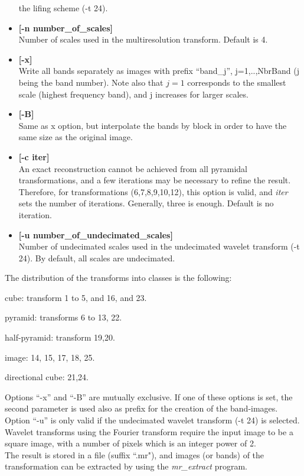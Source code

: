 \begin{itemize}
 the lifing scheme (-t 24).
\item {\bf [-n number\_of\_scales]} \\
 Number of scales used in the multiresolution transform.
 Default is 4.
\item {\bf [-x]} \\
 Write all bands separately as images with prefix ``band\_j'', j=1,..,NbrBand
 (j being the band number). Note also that $j=1$ corresponds to 
 the smallest scale (highest frequency band), and j increases for larger
 scales.
\item {\bf [-B]} \\
 Same as x option, but interpolate the bands by block in order to
 have the same size as the original image.
\item {\bf [-c iter]} \\
An exact reconstruction cannot be achieved from all 
pyramidal transformations, and a few iterations may be necessary to refine
the result. 
Therefore, for transformations (6,7,8,9,10,12), this option
is valid, and {\em iter} sets the  number of iterations. Generally,
three is enough. Default is no iteration.
\item {\bf [-u number\_of\_undecimated\_scales]} \\
Number of undecimated scales used in the undecimated wavelet 
transform (-t 24).
By default, all scales are undecimated.
\end{itemize}

The distribution of the transforms into classes is the following:
\bn
\item cube: transform 1 to 5, and 16, and 23.
\item pyramid: transforms 6 to 13, 22.
\item half-pyramid: transform 19,20.
\item image: 14, 15, 17, 18, 25.
\item directional cube: 21,24.
\en

Options ``-x'' and ``-B'' are mutually
exclusive. If one of these
options is set, the second parameter is used also as prefix for the 
creation of the band-images.  \\
Option ``-u'' is only valid if the undecimated wavelet transform (-t 24)
is selected. \\
Wavelet transforms using the Fourier transform require the input
image to be a square image, with a number of pixels which is an integer 
power of 2. \\
The result is stored in a file (suffix ``.mr"),
and images (or bands) of the transformation can be extracted
by using the {\em mr\_extract} program. \\

